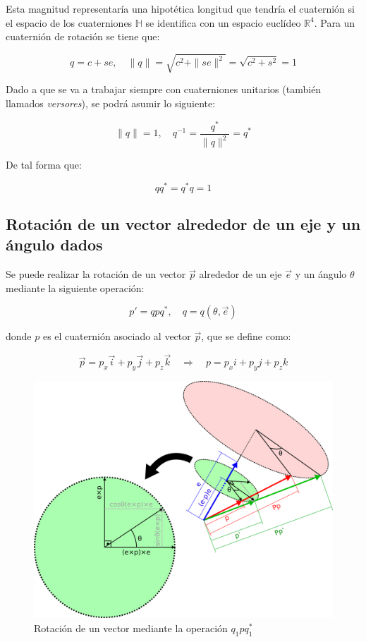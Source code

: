 \documentclass[12pt, a4paper]{report}
\begin{document}
Esta magnitud representaría una hipotética longitud que tendría el cuaternión si el espacio de los cuaterniones $\mathbb{H}$ se identifica con un espacio euclídeo $\mathbb{R}^4$. Para un cuaternión de rotación se tiene que:

$$ q = c + se, \quad \|q\| = \sqrt{c^2 + \|se\|^2} = \sqrt{c^2 + s^2} = 1 $$

Dado a que se va a trabajar siempre con cuaterniones unitarios (también llamados \textit{versores}), se podrá asumir lo siguiente:

\begin{equation}
\|q\| = 1 , \quad q^{-1} = \frac{q^*}{\|q\|^2} = q^*
\end{equation}

De tal forma que:

\begin{equation} \label{eq: qq*}
qq^* = q^*q = 1
\end{equation}

\subsection{Rotación de un vector alrededor de un eje y un ángulo dados}

Se puede realizar la rotación de un vector $\vec{p}$ alrededor de un eje $\vec{e}$ y un ángulo $\theta$ mediante la siguiente operación:

\begin{equation} \label{eq: E14}
p' = qpq^*, \quad q = q(\theta, \vec{e})
\end{equation}

donde $p$ es el cuaternión asociado al vector $\vec{p}$, que se define como:

\begin{equation} \label{eq: E15}
\vec{p} = p_x\vec{i} + p_y\vec{j} + p_z\vec{k} \quad \Rightarrow \quad p = p_xi + p_yj + p_zk
\end{equation}

\begin{figure}[h] 
	\centering
		\includegraphics[scale=1.1]{../img/rotation_quaternion.png} 
	\caption{Rotación de un vector mediante la operación $q_1pq_1^*$}
	\label{fig: rot_cuat}
\end{figure}
\end{document}
